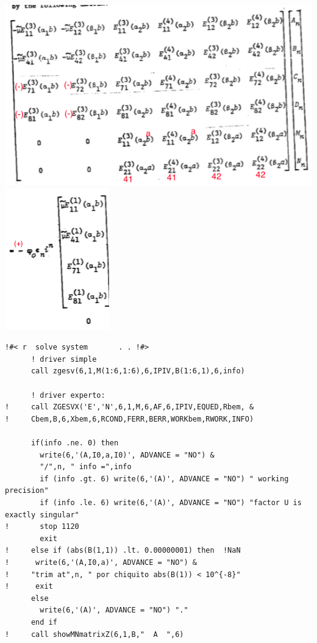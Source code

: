 \documentclass [11pt,spanish]{article}
\begin{document}
\endgroup
\includegraphics[scale=0.6]{matriz}
\includegraphics[scale=0.6]{termindep}
\begingroup
\fontsize{10pt}{12pt}
\selectfont
{}
\begin{shaded}
\begin{verbatim}
!#< r  solve system       . . !#>
      ! driver simple
      call zgesv(6,1,M(1:6,1:6),6,IPIV,B(1:6,1),6,info)
      
      ! driver experto:
!     call ZGESVX('E','N',6,1,M,6,AF,6,IPIV,EQUED,Rbem, &
!     Cbem,B,6,Xbem,6,RCOND,FERR,BERR,WORKbem,RWORK,INFO)
      
      if(info .ne. 0) then
        write(6,'(A,I0,a,I0)', ADVANCE = "NO") &
        "/",n, " info =",info
        if (info .gt. 6) write(6,'(A)', ADVANCE = "NO") " working precision"
        if (info .le. 6) write(6,'(A)', ADVANCE = "NO") "factor U is exactly singular"
!       stop 1120
        exit
!     else if (abs(B(1,1)) .lt. 0.00000001) then  !NaN
!      write(6,'(A,I0,a)', ADVANCE = "NO") &
!     "trim at",n, " por chiquito abs(B(1)) < 10^{-8}"
!      exit
      else
        write(6,'(A)', ADVANCE = "NO") "."
      end if
!     call showMNmatrixZ(6,1,B,"  A  ",6)     
\end{verbatim}
\end{shaded}
\endgroup
\end{document}
